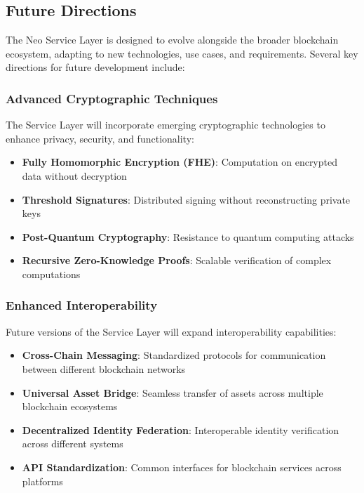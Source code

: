 \subsection{Future Directions}
\label{subsec:nsl-future}

The Neo Service Layer is designed to evolve alongside the broader blockchain ecosystem, adapting to new technologies, use cases, and requirements. Several key directions for future development include:

\subsubsection{Advanced Cryptographic Techniques}
\label{subsubsec:advanced-crypto}

The Service Layer will incorporate emerging cryptographic technologies to enhance privacy, security, and functionality:

\begin{itemize}
    \item \textbf{Fully Homomorphic Encryption (FHE)}: Computation on encrypted data without decryption
    \item \textbf{Threshold Signatures}: Distributed signing without reconstructing private keys
    \item \textbf{Post-Quantum Cryptography}: Resistance to quantum computing attacks
    \item \textbf{Recursive Zero-Knowledge Proofs}: Scalable verification of complex computations
\end{itemize}

\subsubsection{Enhanced Interoperability}
\label{subsubsec:enhanced-interop}

Future versions of the Service Layer will expand interoperability capabilities:

\begin{itemize}
    \item \textbf{Cross-Chain Messaging}: Standardized protocols for communication between different blockchain networks
    \item \textbf{Universal Asset Bridge}: Seamless transfer of assets across multiple blockchain ecosystems
    \item \textbf{Decentralized Identity Federation}: Interoperable identity verification across different systems
    \item \textbf{API Standardization}: Common interfaces for blockchain services across platforms
\end{itemize}

